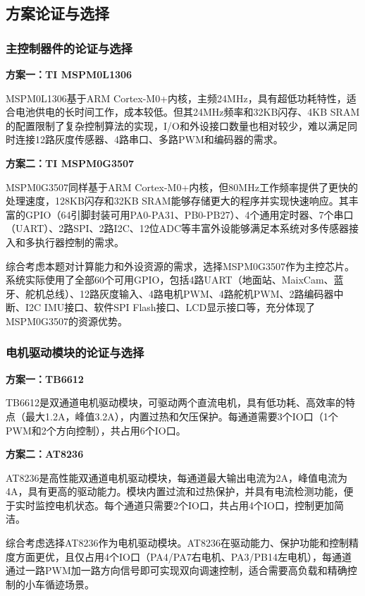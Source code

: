\documentclass[12pt,a4paper]{ctexart}
\begin{document}
\subsection{\textbf{方案论证与选择}}

\subsubsection{\textbf{主控制器件的论证与选择}}

\textbf{方案一：TI MSPM0L1306}

MSPM0L1306基于ARM Cortex-M0+内核，主频24MHz，具有超低功耗特性，适合电池供电的长时间工作，成本较低。但其24MHz频率和32KB闪存、4KB SRAM的配置限制了复杂控制算法的实现，I/O和外设接口数量也相对较少，难以满足同时连接12路灰度传感器、4路串口、多路PWM和编码器的需求。

\textbf{方案二：TI MSPM0G3507}

MSPM0G3507同样基于ARM Cortex-M0+内核，但80MHz工作频率提供了更快的处理速度，128KB闪存和32KB SRAM能够存储更大的程序并实现快速响应。其丰富的GPIO（64引脚封装可用PA0-PA31、PB0-PB27）、4个通用定时器、7个串口（UART）、2路SPI、2路I2C、12位ADC等丰富外设能够满足本系统对多传感器接入和多执行器控制的需求。

综合考虑本题对计算能力和外设资源的需求，选择MSPM0G3507作为主控芯片。系统实际使用了全部60个可用GPIO，包括4路UART（地面站、MaixCam、蓝牙、舵机总线）、12路灰度输入、4路电机PWM、4路舵机PWM、2路编码器中断、I2C IMU接口、软件SPI Flash接口、LCD显示接口等，充分体现了MSPM0G3507的资源优势。

\subsubsection{\textbf{电机驱动模块的论证与选择}}

\textbf{方案一：TB6612}

TB6612是双通道电机驱动模块，可驱动两个直流电机，具有低功耗、高效率的特点（最大1.2A，峰值3.2A），内置过热和欠压保护。每通道需要3个IO口（1个PWM和2个方向控制），共占用6个IO口。

\textbf{方案二：AT8236}

AT8236是高性能双通道电机驱动模块，每通道最大输出电流为2A，峰值电流为4A，具有更高的驱动能力。模块内置过流和过热保护，并具有电流检测功能，便于实时监控电机状态。每个通道只需要2个IO口，共占用4个IO口，控制更加简洁。

综合考虑选择AT8236作为电机驱动模块。AT8236在驱动能力、保护功能和控制精度方面更优，且仅占用4个IO口（PA4/PA7右电机、PA3/PB14左电机），每通道通过一路PWM加一路方向信号即可实现双向调速控制，适合需要高负载和精确控制的小车循迹场景。
\end{document}
